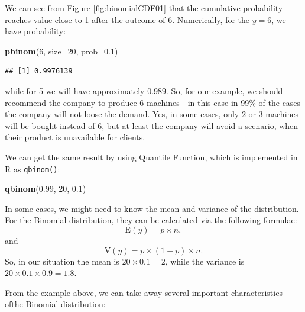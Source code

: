 \documentclass[
]{book}
\newenvironment{Shaded}{\begin{snugshade}}{\end{snugshade}}
\newcommand{\DataTypeTok}[1]{\textcolor[rgb]{0.13,0.29,0.53}{#1}}
\newcommand{\DecValTok}[1]{\textcolor[rgb]{0.00,0.00,0.81}{#1}}
\newcommand{\FloatTok}[1]{\textcolor[rgb]{0.00,0.00,0.81}{#1}}
\newcommand{\KeywordTok}[1]{\textcolor[rgb]{0.13,0.29,0.53}{\textbf{#1}}}
\newcommand{\NormalTok}[1]{#1}
\theoremstyle{definition}
\theoremstyle{definition}
\theoremstyle{definition}
\theoremstyle{definition}
\theoremstyle{remark}
\begin{document}
We can see from Figure \ref{fig:binomialCDF01} that the cumulative probability reaches value close to 1 after the outcome of 6. Numerically, for the \(y=6\), we have probability:

\begin{Shaded}
\begin{Highlighting}[]
\KeywordTok{pbinom}\NormalTok{(}\DecValTok{6}\NormalTok{, }\DataTypeTok{size=}\DecValTok{20}\NormalTok{, }\DataTypeTok{prob=}\FloatTok{0.1}\NormalTok{)}
\end{Highlighting}
\end{Shaded}

\begin{verbatim}
## [1] 0.9976139
\end{verbatim}

while for 5 we will have approximately 0.989. So, for our example, we should recommend the company to produce 6 machines - in this case in 99\% of the cases the company will not loose the demand. Yes, in some cases, only 2 or 3 machines will be bought instead of 6, but at least the company will avoid a scenario, when their product is unavailable for clients.

We can get the same result by using Quantile Function, which is implemented in R as \texttt{qbinom()}:

\begin{Shaded}
\begin{Highlighting}[]
\KeywordTok{qbinom}\NormalTok{(}\FloatTok{0.99}\NormalTok{, }\DecValTok{20}\NormalTok{, }\FloatTok{0.1}\NormalTok{)}
\end{Highlighting}
\end{Shaded}

In some cases, we might need to know the mean and variance of the distribution. For the Binomial distribution, they can be calculated via the following formulae:
\begin{equation}
    \mathrm{E}(y) = p \times n ,
    \label{eq:BinomialMean}
\end{equation}
and
\begin{equation}
    \mathrm{V}(y) = p \times (1-p) \times n .
    \label{eq:BinomialVariance}
\end{equation}
So, in our situation the mean is \(20 \times 0.1 = 2\), while the variance is \(20 \times 0.1 \times 0.9 = 1.8\).

From the example above, we can take away several important characteristics ofthe Binomial distribution:
\end{document}
